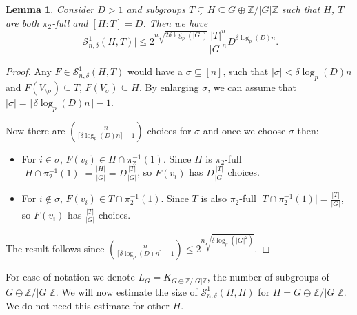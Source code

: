 \documentclass[12pt]{amsart}
\newtheorem{lemma}[theorem]{Lemma}
\theoremstyle{definition}
\newcommand{\SSO}[3]{\mathcal{S}^1_{#1}(#2,#3)}
\newcommand{\Vsigma}{V_{\setminus\sigma}}
\newcommand{\ZG}{\Z/\abs{G}\Z}
\newcommand{\abs}[1]{\vert#1\vert}
\newcommand{\Zp}{\Z_p}
\newcommand{\Z}{\mathbb{Z}}
\newcommand{\Hom}{\text{Hom}}
\newcommand{\ceil}[1]{\lceil#1\rceil}
\begin{document}
\begin{lemma}
Consider $D>1$ and subgroups $T\subsetneq H\subseteq G\oplus\ZG$ such that $H$, $T$ are both $\pi_2$-full and $[H:T]=D$. Then we have
\[
\abs{\SSO{n,\delta}{H}{T}}
\leq 2^{n\sqrt{2\delta\log_p(\abs{G})}}
 \frac{\abs{T}^n}{\abs{G}^n} D^{\delta\log_p(D)n}.
\]
\end{lemma}
\begin{proof}
Any $F\in\SSO{n,\delta}{H}{T}$ would have a $\sigma\subseteq [n]$, such that $\abs{\sigma}<\delta\log_p(D)n$ and $F(\Vsigma)\subseteq T$, $F(V_{\sigma})\subseteq H$. By enlarging $\sigma$, we can assume that $\abs{\sigma}=\ceil{\delta\log_p(D) n}-1$.

Now there are $\binom{n}{\ceil{\delta\log_p(D) n}-1}$ choices for $\sigma$ and once we choose $\sigma$ then:
\begin{itemize}
    \item For $i\in \sigma$, $F(v_i)\in H\cap\pi_2^{-1}(1)$. Since $H$ is $\pi_2$-full $\abs{H\cap\pi_2^{-1}(1)}=\frac{\abs{H}}{\abs{G}}=D\frac{\abs{T}}{\abs{G}}$, so $F(v_i)$ has $D\frac{\abs{T}}{\abs{G}}$ choices.
    \item For $i\not\in \sigma$, $F(v_i)\in T\cap\pi_2^{-1}(1)$. Since $T$ is also $\pi_2$-full $\abs{T\cap\pi_2^{-1}(1)}=\frac{\abs{T}}{\abs{G}}$, so $F(v_i)$ has $\frac{\abs{T}}{\abs{G}}$ choices.
\end{itemize}
The result follows since $\binom{n}{\ceil{\delta\log_p(D) n}-1}\leq 2^{n\sqrt{\delta\log_p(\abs{G}^2)}}$.
\end{proof}

For ease of notation we denote $L_G=K_{G\oplus\ZG}$, the number of subgroups of $G\oplus\ZG$. We will now estimate the size of $\SSO{n,\delta}{H}{H}$ for $H=G\oplus\ZG$. We do not need this estimate for other $H$.
\end{document}
